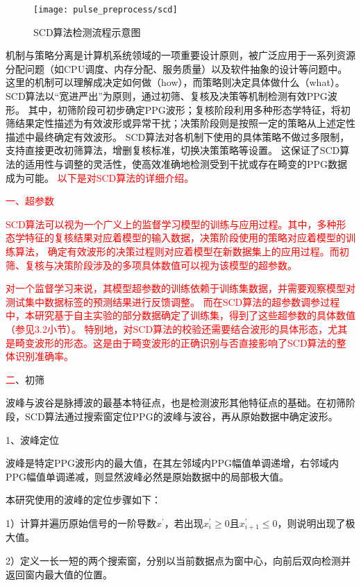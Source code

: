 \begin{figure}[htbp]
    \centering
    \texttt{[image: pulse\_preprocess/scd]}
    \caption{\label{fig:detect}SCD算法检测流程示意图}
\end{figure}

机制与策略分离是计算机系统领域的一项重要设计原则，被广泛应用于一系列资源分配问题（如CPU调度、内存分配、服务质量）以及软件抽象的设计等问题中\cite{Levin1975}。
这里的机制可以理解成决定如何做（how），而策略则决定具体做什么（what）。
SCD算法以“宽进严出”为原则，通过初筛、复核及决策等机制检测有效PPG波形。
其中，初筛阶段可初步确定PPG波形；复核阶段利用多种形态学特征，将初筛结果定性描述为有效波形或异常干扰；决策阶段则是按照一定的策略从上述定性描述中最终确定有效波形。
SCD算法对各机制下使用的具体策略不做过多限制，支持直接更改初筛算法，增删复核标准，切换决策策略等设置。
这保证了SCD算法的适用性与调整的灵活性，使高效准确地检测受到干扰或存在畸变的PPG数据成为可能。
\textcolor{red}{以下是对SCD算法的详细介绍。}

\textcolor{red}{一、超参数}

\textcolor{red}{SCD算法可以视为一个广义上的监督学习模型的训练与应用过程\cite{Zhou2016}。其中，多种形态学特征的复核结果对应着模型的输入数据，决策阶段使用的策略对应着模型的训练算法，
确定有效波形的决策过程则对应着模型在新数据集上的应用过程。而初筛、复核与决策阶段涉及的多项具体数值可以视为该模型的超参数。}

\textcolor{red}{对一个监督学习来说，其模型超参数的训练依赖于训练集数据，并需要观察模型对测试集中数据标签的预测结果进行反馈调整\cite{Zhou2016}。
而在SCD算法的超参数调参过程中，本研究基于自主实验的部分数据确定了训练集，得到了这些超参数的具体数值（参见3.2小节）。
特别地，对SCD算法的校验还需要结合波形的具体形态，尤其是畸变波形的形态。这是由于畸变波形的正确识别与否直接影响了SCD算法的整体识别准确率。
}

\textcolor{red}{二}、初筛

波峰与波谷是脉搏波的最基本特征点，也是检测波形其他特征点的基础。在初筛阶段，SCD算法通过搜索窗定位PPG的波峰与波谷，再从原始数据中确定波形。

1、波峰定位

波峰是特定PPG波形内的最大值，在其左邻域内PPG幅值单调递增，右邻域内PPG幅值单调递减，则显然波峰必然是原始数据中的局部极大值。

本研究使用的波峰的定位步骤如下：

1）计算并遍历原始信号的一阶导数$x^{'}$，若出现$x_i^{'}\ge 0$且$x_{i+1}^{'}\le 0$，则说明出现了极大值。

2）定义一长一短的两个搜索窗，分别以当前数据点为窗中心，向前后双向检测并返回窗内最大值的位置。

